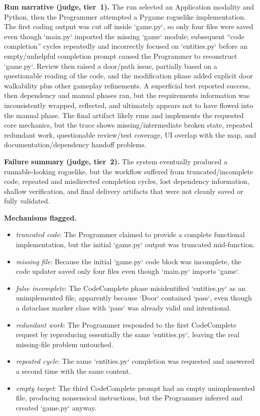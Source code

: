 \textbf{Run narrative (judge, tier~1).} The run selected an Application modality and Python, then the Programmer attempted a Pygame roguelike implementation. The first coding output was cut off inside `game.py`, so only four files were saved even though `main.py` imported the missing `game` module; subsequent ``code completion'' cycles repeatedly and incorrectly focused on `entities.py` before an empty/unhelpful completion prompt caused the Programmer to reconstruct `game.py`. Review then raised a door/path issue, partially based on a questionable reading of the code, and the modification phase added explicit door walkability plus other gameplay refinements. A superficial test reported success, then dependency and manual phases ran, but the requirements information was inconsistently wrapped, reflected, and ultimately appears not to have flowed into the manual phase. The final artifact likely runs and implements the requested core mechanics, but the trace shows missing/intermediate broken state, repeated redundant work, questionable review/test coverage, UI overlap with the map, and documentation/dependency handoff problems.

\textbf{Failure summary (judge, tier~2).} The system eventually produced a runnable-looking roguelike, but the workflow suffered from truncated/incomplete code, repeated and misdirected completion cycles, lost dependency information, shallow verification, and final delivery artifacts that were not cleanly saved or fully validated.

\textbf{Mechanisms flagged.}
\begin{itemize}
  \item \emph{truncated code}: The Programmer claimed to provide a complete functional implementation, but the initial `game.py` output was truncated mid-function.
  \item \emph{missing file}: Because the initial `game.py` code block was incomplete, the code updater saved only four files even though `main.py` imports `game`.
  \item \emph{false incomplete}: The CodeComplete phase misidentified `entities.py` as an unimplemented file, apparently because `Door` contained `pass`, even though a dataclass marker class with `pass` was already valid and intentional.
  \item \emph{redundant work}: The Programmer responded to the first CodeComplete request by reproducing essentially the same `entities.py`, leaving the real missing-file problem untouched.
  \item \emph{repeated cycle}: The same `entities.py` completion was requested and answered a second time with the same content.
  \item \emph{empty target}: The third CodeComplete prompt had an empty unimplemented file, producing nonsensical instructions, but the Programmer inferred and created `game.py` anyway.
\end{itemize}

